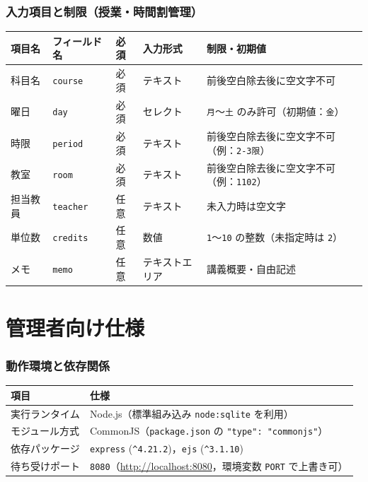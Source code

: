\documentclass[
  a4paper,
  fontsize=11pt,
  line_length=40zw,
  number_of_lines=35,
  baselineskip=1.7zw
]{jlreq}
\begin{document}
\section{入力項目と制限（授業・時間割管理）}

\begin{table}[htbp]
  \centering
  \small
  \begin{tabularx}{\textwidth}{llllX}
    \toprule
    項目名 & フィールド名 & 必須 & 入力形式 & 制限・初期値 \\
    \midrule
    科目名 & \texttt{course} & 必須 & テキスト & 前後空白除去後に空文字不可 \\
    曜日 & \texttt{day} & 必須 & セレクト & \texttt{月}〜\texttt{土} のみ許可（初期値：\texttt{金}） \\
    時限 & \texttt{period} & 必須 & テキスト & 前後空白除去後に空文字不可（例：\texttt{2-3限}） \\
    教室 & \texttt{room} & 必須 & テキスト & 前後空白除去後に空文字不可（例：\texttt{1102}） \\
    担当教員 & \texttt{teacher} & 任意 & テキスト & 未入力時は空文字 \\
    単位数 & \texttt{credits} & 任意 & 数値 & \texttt{1}〜\texttt{10} の整数（未指定時は \texttt{2}） \\
    メモ & \texttt{memo} & 任意 & テキストエリア & 講義概要・自由記述 \\
    \bottomrule
  \end{tabularx}
\end{table}

\part{管理者向け仕様}

\section{動作環境と依存関係}

\begin{table}[htbp]
  \centering
  \small
  \begin{tabularx}{\textwidth}{lX}
    \toprule
    項目 & 仕様 \\
    \midrule
    実行ランタイム & Node.js（標準組み込み \texttt{node:sqlite} を利用） \\
    モジュール方式 & CommonJS（\texttt{package.json} の \texttt{"type": "commonjs"}） \\
    依存パッケージ & \texttt{express} (\texttt{\^{}4.21.2})，\texttt{ejs} (\texttt{\^{}3.1.10}) \\
    待ち受けポート & \texttt{8080}（\url{http://localhost:8080}，環境変数 \texttt{PORT} で上書き可） \\
    \bottomrule
  \end{tabularx}
\end{table}
\end{document}
